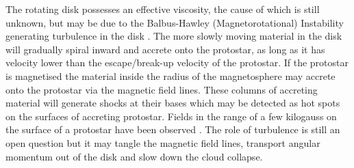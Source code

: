 The rotating disk possesses an effective viscosity, the cause of which is still unknown, but may be due to the Balbus-Hawley (Magnetorotational) Instability \citep{1991ApJ...376..214B} generating turbulence in the disk .
The more slowly moving material in the disk will gradually spiral inward and accrete onto the protostar, as long as it has velocity lower than the escape/break-up velocity of the protostar.
If the protostar is magnetised the material inside the radius of the
magnetosphere may accrete onto the protostar via the magnetic field lines.
These columns of accreting material will generate shocks at their bases which
may be detected as hot spots on the surfaces of accreting protostar.
Fields in the range of a few kilogauss on the surface of a protostar have been observed \citep{1993PASP..105..955H}.
The role of turbulence is still an open question but it may tangle the magnetic
field lines, transport angular momentum out of the disk and slow down the cloud
collapse.

